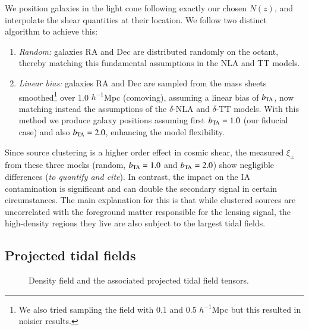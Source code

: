 \documentclass[useAMS,usenatbib]{mn2e}
\begin{document}
We position galaxies in the light cone following exactly our chosen $N(z)$, and interpolate the shear quantities at their location. We follow two distinct algorithm to achieve this:
\begin{enumerate}
\item {\it Random:} galaxies RA and Dec are distributed randomly on the octant, thereby matching this fundamental assumptions in the NLA and TT models. 
\item {\it Linear bias:} galaxies RA and Dec are sampled from the mass sheets smoothed\footnote{We also tried sampling the field with 0.1 and 0.5 $h^{-1}$Mpc but this resulted in noisier results.} over 1.0 $h^{-1}$Mpc (comoving), assuming a linear bias of $b_{\rm TA}$, now matching instead the assumptions of the $\delta$-NLA and $\delta$-TT models. With this method we produce galaxy positions assuming first $b_{\rm TA}=1.0$ (our fiducial case) and also $b_{\rm TA}=2.0$, enhancing the  model flexibility. 
\end{enumerate}

Since source clustering is a higher order effect in cosmic shear, the measured $\xi_{\pm}$ from these three mocks (random, $b_{\rm TA}=1.0$ and $b_{\rm TA}=2.0$) show negligible differences ({\it to quantify and cite}).
In contrast, the impact on the IA contamination is significant and can double the secondary signal in certain circumstances. The main explanation for this is that while clustered sources are uncorrelated with the foreground matter responsible for the lensing signal, the high-density regions they live are also subject to the largest tidal fields. 

\subsection{Projected tidal fields}
\label{subsec:IA_sims}

\begin{figure}
\caption{Density field and the associated projected tidal field tensors.}
\label{fig:maps}
\end{figure}
\end{document}
